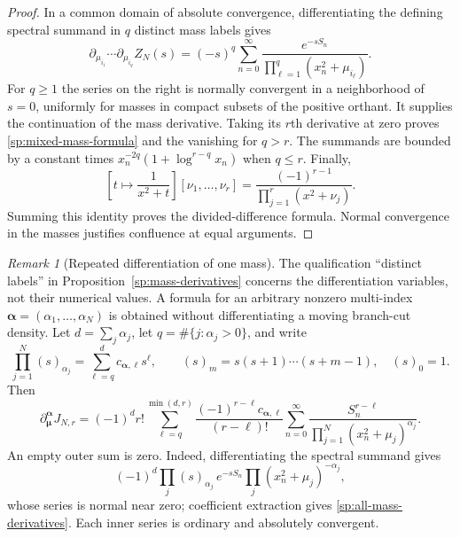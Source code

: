 \documentclass[11pt,letterpaper]{article}
\numberwithin{equation}{section}
\theoremstyle{definition}
\theoremstyle{remark}
\newtheorem{remark}[theorem]{Remark}
\begin{document}
\begin{proof}
In a common domain of absolute convergence, differentiating the
defining spectral summand in $q$ distinct mass labels gives
\[
 \partial_{\mu_{i_1}}\cdots\partial_{\mu_{i_q}}Z_N(s)
 =(-s)^q\sum_{n=0}^{\infty}
     \frac{e^{-sS_n}}{\prod_{\ell=1}^{q}(x_n^2+\mu_{i_\ell})}.
\]
For $q\geq1$ the series on the right is normally convergent in
a neighborhood of $s=0$, uniformly for masses in compact subsets
of the positive orthant.  It supplies the continuation of the
mass derivative.  Taking its $r$th derivative at zero proves
\eqref{sp:mixed-mass-formula} and the vanishing for $q>r$.
The summands are bounded by a constant times
$x_n^{-2q}(1+\log^{r-q}x_n)$ when $q\leq r$.
Finally,
\[
 \left[t\longmapsto\frac{1}{x^2+t}\right]
        [\nu_1,\ldots,\nu_r]
 =\frac{(-1)^{r-1}}{\prod_{j=1}^{r}(x^2+\nu_j)}.
\]
Summing this identity proves the divided-difference formula.
Normal convergence in the masses justifies confluence at equal
arguments.
\end{proof}

\begin{remark}[Repeated differentiation of one mass]
\label{sp:repeated-mass-derivatives}
The qualification ``distinct labels'' in
Proposition~\ref{sp:mass-derivatives} concerns the differentiation
variables, not their numerical values.  A formula for an arbitrary
nonzero multi-index $\boldsymbol\alpha=(\alpha_1,\ldots,\alpha_N)$
is obtained without differentiating a moving branch-cut density.
Let $d=\sum_j\alpha_j$, let $q=\#\{j:\alpha_j>0\}$, and write
\[
 \prod_{j=1}^{N}(s)_{\alpha_j}
      =\sum_{\ell=q}^{d}c_{\boldsymbol\alpha,\ell}s^\ell,
 \qquad (s)_m=s(s+1)\cdots(s+m-1),\quad (s)_0=1.
\]
Then
\begin{equation}
 \partial_{\boldsymbol\mu}^{\boldsymbol\alpha}J_{N,r}
 =(-1)^d r!\sum_{\ell=q}^{\min(d,r)}
       \frac{(-1)^{r-\ell}c_{\boldsymbol\alpha,\ell}}{(r-\ell)!}
       \sum_{n=0}^{\infty}
       \frac{S_n^{r-\ell}}
            {\prod_{j=1}^{N}(x_n^2+\mu_j)^{\alpha_j}}.
 \label{sp:all-mass-derivatives}
\end{equation}
An empty outer sum is zero.  Indeed, differentiating the spectral
summand gives
\[
 (-1)^d\prod_j(s)_{\alpha_j}\,e^{-sS_n}
                  \prod_j(x_n^2+\mu_j)^{-\alpha_j},
\]
whose series is normal near
zero; coefficient extraction gives
\eqref{sp:all-mass-derivatives}.  Each inner series is ordinary
and absolutely convergent.
\end{remark}
\end{document}
